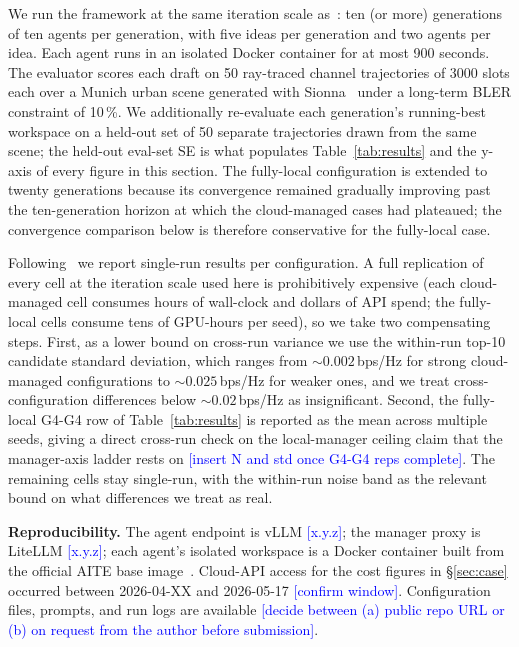 \documentclass[journal]{IEEEtran}
\newcommand{\tbd}[1]{\textcolor{blue}{[#1]}}
\begin{document}
We run the framework at the same iteration scale as~\cite{aitaoudia2026aite}: ten (or more) generations of ten agents per generation, with five ideas per generation and two agents per idea. Each agent runs in an isolated Docker container for at most 900 seconds. The evaluator scores each draft on 50 ray-traced channel trajectories of 3000 slots each over a Munich urban scene generated with Sionna~\cite{sionna} under a long-term BLER constraint of 10\,\%. We additionally re-evaluate each generation's running-best workspace on a held-out set of 50 separate trajectories drawn from the same scene; the held-out eval-set SE is what populates Table~\ref{tab:results} and the y-axis of every figure in this section. The fully-local configuration is extended to twenty generations because its convergence remained gradually improving past the ten-generation horizon at which the cloud-managed cases had plateaued; the convergence comparison below is therefore conservative for the fully-local case.

Following~\cite{aitaoudia2026aite} we report single-run results per configuration. A full replication of every cell at the iteration scale used here is prohibitively expensive (each cloud-managed cell consumes hours of wall-clock and dollars of API spend; the fully-local cells consume tens of GPU-hours per seed), so we take two compensating steps. First, as a lower bound on cross-run variance we use the within-run top-10 candidate standard deviation, which ranges from ${\sim}0.002$\,bps/Hz for strong cloud-managed configurations to ${\sim}0.025$\,bps/Hz for weaker ones, and we treat cross-configuration differences below ${\sim}0.02$\,bps/Hz as insignificant. Second, the fully-local G4-G4 row of Table~\ref{tab:results} is reported as the mean across multiple seeds, giving a direct cross-run check on the local-manager ceiling claim that the manager-axis ladder rests on \tbd{insert N and std once G4-G4 reps complete}. The remaining cells stay single-run, with the within-run noise band as the relevant bound on what differences we treat as real.

\textbf{Reproducibility.} The agent endpoint is vLLM \tbd{x.y.z}; the manager proxy is LiteLLM \tbd{x.y.z}; each agent's isolated workspace is a Docker container built from the official AITE base image~\cite{aitaoudia2026aite}. Cloud-API access for the cost figures in \S\ref{sec:case} occurred between 2026-04-XX and 2026-05-17 \tbd{confirm window}. Configuration files, prompts, and run logs are available \tbd{decide between (a) public repo URL or (b) on request from the author before submission}.
\end{document}
